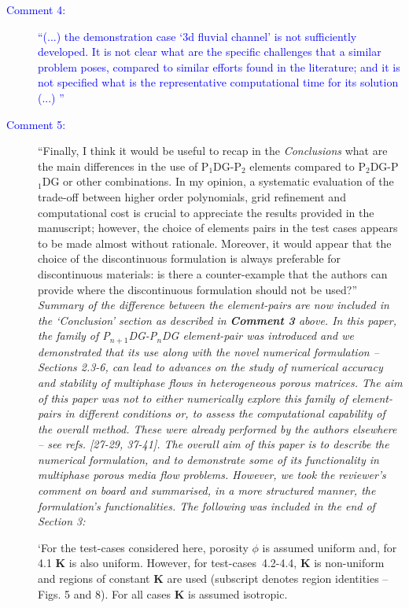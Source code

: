 \documentclass[12pts,a4paper,amsmath,amssymb,floatfix]{article}
\newcommand{\PN}[2][error]{P$_{#1}$DG-P$_{#2}$}
\newcommand{\PNDG}[2][error]{P$_{#1}$DG-P$_{#2}$DG}
\newcommand{\blue}{\textcolor{blue}}
\begin{document}
\begin{description}
\item[\blue{Comment 4:}] \blue{``(...) the demonstration case `3d fluvial channel' is not sufficiently developed. It is not clear what are the specific challenges that a similar problem poses, compared to similar efforts found in the literature; and it is not specified what is the representative computational time for its solution (...) ''}\\
\item[\blue{Comment 5:}] ``Finally, I think it would be useful to recap in the {\it Conclusions} what are the main differences in the use of \PN[1]{2} elements compared to \PNDG[2]{1} or other combinations. In my opinion, a systematic evaluation of the trade-off between higher order polynomials, grid refinement and computational cost is crucial to appreciate the results provided in the manuscript; however, the choice of elements pairs in the test cases appears to be made almost without rationale. Moreover, it would appear that the choice of the discontinuous formulation is always preferable for discontinuous materials: is there a counter-example that the authors can provide where the discontinuous formulation should not be used?''\\
{\it Summary of the difference between the element-pairs are now included in the `Conclusion' section as described in {\bf Comment 3} above. In this paper, the family of \PNDG[n+1]{n} element-pair was introduced and we demonstrated that its use along with the novel numerical formulation -- Sections 2.3-6, can lead to advances on the study of numerical accuracy and stability of multiphase flows in heterogeneous porous matrices. The aim of this paper was not to either numerically explore this family of element-pairs in different conditions or, to assess the computational capability of the overall method. These were already performed by the authors elsewhere -- see refs. [27-29, 37-41]. The overall aim of this paper is to describe the numerical formulation, and to demonstrate some of its functionality in multiphase porous media flow problems. However, we took the reviewer's comment on board and summarised, in a more structured manner, the formulation's functionalities. The following was included in the end of Section 3:} 

`For the test-cases considered here, porosity $\phi$ is assumed uniform and, for 4.1 $\mathbf{K}$ is also uniform. However, for test-cases~4.2-4.4, $\mathbf{K}$ is non-uniform and regions of constant $\mathbf{K}$ are used (subscript denotes region identities -- Figs. 5 and 8). For all cases $\mathbf{K}$ is assumed isotropic.


\end{description}
\end{document}
